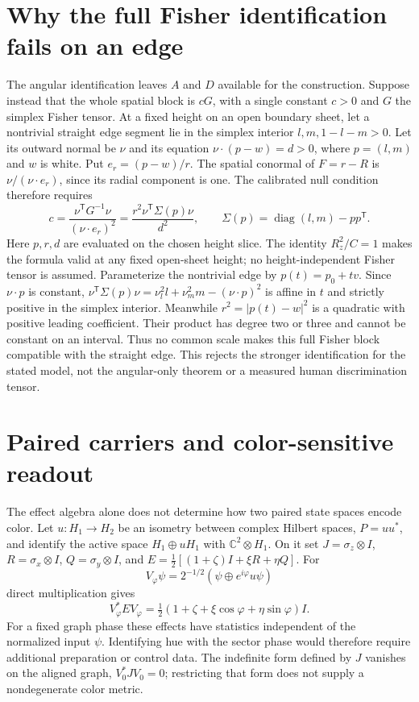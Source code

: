 \documentclass[9pt,twocolumn,twoside]{opticajnl}
\theoremstyle{plain}
\begin{document}
\section{Why the full Fisher identification fails on an edge}
\label{app:full-fisher}
The angular identification leaves $A$ and $D$ available for the construction. Suppose instead that the whole spatial block is $cG$, with a single constant $c>0$ and $G$ the simplex Fisher tensor. At a fixed height on an open boundary sheet, let a nontrivial straight edge segment lie in the simplex interior $l,m,1-l-m>0$. Let its outward normal be $\nu$ and its equation $\nu\cdot(p-w)=d>0$, where $p=(l,m)$ and $w$ is white. Put $e_r=(p-w)/r$. The spatial conormal of $F=r-R$ is $\nu/(\nu\cdot e_r)$, since its radial component is one. The calibrated null condition therefore requires
\begin{equation}
 c=\frac{\nu^\mathsf{T}G^{-1}\nu}{(\nu\cdot e_r)^2}
   =\frac{r^2\nu^\mathsf{T}\Sigma(p)\nu}{d^2},\qquad
 \Sigma(p)=\operatorname{diag}(l,m)-pp^\mathsf{T}.
 \label{eq:full-fisher-edge}
\end{equation}
Here $p,r,d$ are evaluated on the chosen height slice. The identity $R_z^2/C=1$ makes the formula valid at any fixed open-sheet height; no height-independent Fisher tensor is assumed.
Parameterize the nontrivial edge by $p(t)=p_0+tv$. Since $\nu\cdot p$ is constant, $\nu^\mathsf{T}\Sigma(p)\nu=\nu_l^2l+\nu_m^2m-(\nu\cdot p)^2$ is affine in $t$ and strictly positive in the simplex interior. Meanwhile $r^2=|p(t)-w|^2$ is a quadratic with positive leading coefficient. Their product has degree two or three and cannot be constant on an interval. Thus no common scale makes this full Fisher block compatible with the straight edge. This rejects the stronger identification for the stated model, not the angular-only theorem or a measured human discrimination tensor.

\section{Paired carriers and color-sensitive readout}
\label{app:paired-readout}
The effect algebra alone does not determine how two paired state spaces encode color. Let $u:H_1\to H_2$ be an isometry between complex Hilbert spaces, $P=uu^*$, and identify the active space $H_1\oplus uH_1$ with $\mathbb C^2\otimes H_1$. On it set $J=\sigma_z\otimes I$, $R=\sigma_x\otimes I$, $Q=\sigma_y\otimes I$, and $E=\tfrac12[(1+\zeta)I+\xi R+\eta Q]$. For
\begin{equation}
 V_\varphi\psi=2^{-1/2}(\psi\oplus e^{i\varphi}u\psi)
 \label{eq:paired-graph}
\end{equation}
direct multiplication gives
\begin{equation}
 V_\varphi^*EV_\varphi
 =\tfrac12(1+\zeta+\xi\cos\varphi+\eta\sin\varphi)I.
 \label{eq:paired-phase-statistics}
\end{equation}
For a fixed graph phase these effects have statistics independent of the normalized input $\psi$. Identifying hue with the sector phase would therefore require additional preparation or control data. The indefinite form defined by $J$ vanishes on the aligned graph, $V_0^*JV_0=0$; restricting that form does not supply a nondegenerate color metric.
\end{document}
